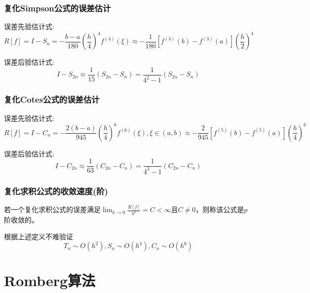 \subsubsection{复化Simpson公式的误差估计}

误差先验估计式:
\begin{equation*}
    R[f] = I-S_n = -\frac{b-a}{180}(\frac{h}{4})^4f^{(4)}(\xi ) \approx -\frac{1}{180}[f^{(3)}(b)-f^{(3)}(a)](\frac{h}{2})^4
\end{equation*}

误差后验估计式:
\begin{equation*}
    I-S_{2n} \approx \frac{1}{15}(S_{2n}-S_n) = \frac{1}{4^2-1}(S_{2n}-S_n)
\end{equation*}

\subsubsection{复化Cotes公式的误差估计}

误差先验估计式:
\begin{equation*}
    R[f] = I-C_n = -\frac{2(b-a)}{945}(\frac{h}{4})^6f^{(6)}(\xi ),\xi \in (a,b) \approx -\frac{2}{945}[f^{(5)}(b)-f^{(5)}(a)](\frac{h}{4})^6
\end{equation*}

误差后验估计式:
\begin{equation*}
    I-C_{2n} \approx \frac{1}{63}(C_{2n}-C_n) = \frac{1}{4^3-1}(C_{2n}-C_n)
\end{equation*}

\subsubsection{复化求积公式的收敛速度(阶)}
\begin{definition}[$p$阶收敛]
    若一个复化求积公式的误差满足$\lim_{h\rightarrow 0}\frac{R[f]}{h^p} = C<\infty $且$C\neq 0$，则称该公式是$p$阶收敛的。
\end{definition}
\begin{remark}
    根据上述定义不难验证
    \begin{equation}
        T_n\sim O(h^2),S_n\sim O(h^4),C_n\sim O(h^6)
    \end{equation}
\end{remark}

\section{Romberg算法}

